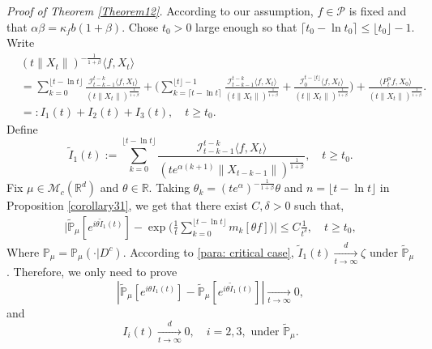 \documentclass[12pt,a4paper]{amsart}
\theoremstyle{plain}
\theoremstyle{definition}
\numberwithin{equation}{section}
\begin{document}
{\it Proof of Theorem \ref{Theorem12}.}\quad
    According to our assumption, $f\in\mathcal{P}$ is fixed and that  $\alpha\beta=\kappa_fb(1+\beta)$.
    Chose $t_0 > 0$ large enough so that $\lceil t_0-\ln t_0\rceil \leq \lfloor t_0 \rfloor - 1.$
    Write
    \begin{align*}
        &(t\|X_t\|)^{-\frac{1}{1+\beta}}\langle f,X_t\rangle
        \\ &=\sum_{k=0}^{\lfloor t-\ln t \rfloor} \frac{\mathcal I_{t-k-1}^{t-k}\langle f ,X_t\rangle}{(t\|X_t\|)^{\frac{1}{1+\beta}}}+\Big(\sum_{k=\lceil t-\ln t \rceil}^{\lfloor t \rfloor-1} \frac{\mathcal I_{t-k-1}^{t-k}\langle f ,X_t\rangle}{(t\|X_t\|)^{\frac{1}{1+\beta}}}+\frac{\mathcal I_0^{t-\lfloor t \rfloor}\langle f ,X_t\rangle}{(t\|X_t\|)^{\frac{1}{1+\beta}}}\Big) +
         \frac{\langle P^\alpha_tf,X_0\rangle}{(t\|X_t\|)^{\frac{1}{1+\beta}}}.
        \\&=:I_1(t)+I_2(t) + I_3(t),
        \quad t\geq t_0.
    \end{align*}
    Define
\[
    \tilde I_1(t)
    :=\sum_{k=0}^{\lfloor t-\ln t \rfloor}\frac{\mathcal I_{t-k-1}^{t-k}\langle f ,X_t\rangle}{(t e^{\alpha(k+1)}\|X_{t-k-1}\|)^{\frac{1}{1+\beta}}},
    \quad t\geq t_0.
\]
    Fix $\mu \in \mathcal M_c(\mathbb R^d)$ and $\theta\in \mathbb R$. Taking $\theta_k=(t e^{\alpha})^{-\frac{1}{1+\beta}} \theta $ and $n={\lfloor t-\ln t \rfloor}$
    in Proposition \ref{corollary31},
    we get that there exist $C,\delta>0$ such that,
\begin{align*}
        \Big|\mathbb{\tilde{P}}_{\mu} [e^{i\theta\tilde{I}_1(t)}]-\exp\Big(\frac{1}{t}\sum_{k=0}^{\lfloor t-\ln t \rfloor}m_k[\theta f]\Big)\Big|\leq C \frac{1}{t^{\delta}},
        \quad t\geq t_0,
\end{align*}
    Where $\mathcal{\mathbb{P}}_{\mu}=\mathbb{P}_{\mu}(\cdot|D^c)$. According to \eqref{para: critical case},  $\tilde{I}_1(t)\xrightarrow[t\to \infty]{d}\zeta$ under $\tilde {\mathbb P}_\mu$.
    Therefore, we only need to prove
 \begin{equation}\label{toprove-1}|\mathbb{\tilde{P}}_{\mu}[e^{i\theta I_1(t)}]-\mathbb{\tilde{P}}_{\mu}[e^{i\theta\tilde{I}_1(t)}]|\xrightarrow[t\to \infty]{} 0,
 \end{equation}
      and
     \begin{equation}\label{toprove-2}
     I_i(t)\xrightarrow[t\to \infty]{d} 0,\quad i = 2,3,  \mbox{ under } \tilde {\mathbb P}_\mu.\end{equation}
\end{document}
